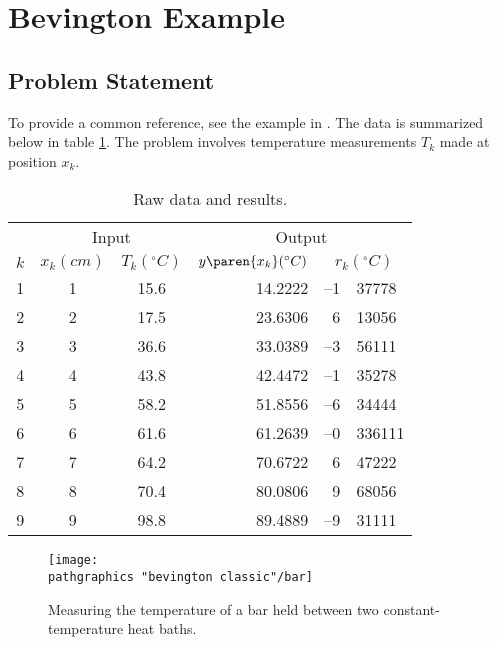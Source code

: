 \section{\label{sec:bevington example}Bevington Example}  %
\subsection{Problem Statement}  %
To provide a common reference, see the example in \cite[ch 6]{Bevington}. The data is summarized below in table \ref{tab:bevington data and results}. The problem involves temperature measurements $T_{k}$ made at position $x_{k}$. 

\begin{table}[h]
	\begin{center}
		\begin{tabular}{rcc|rr@{.}l}
		  & \multicolumn{2}{c}{Input} &  \multicolumn{3}{c}{Output} \\
		  $k$ & $x_{k} (cm) $ & $T_{k} (^{\circ}C)$ & $y\paren{x_{k}} (^{\circ}C)$ & \multicolumn{2}{c}{$r_{k} (^{\circ}C)$} \\\hline
			 1 & 1 & 15.6 & 14.2222 & --1 & 37778 \\
			 2 & 2 & 17.5 & 23.6306 &   6 & 13056 \\
			 3 & 3 & 36.6 & 33.0389 & --3 & 56111 \\
			 4 & 4 & 43.8 & 42.4472 & --1 & 35278 \\
			 5 & 5 & 58.2 & 51.8556 & --6 & 34444 \\
			 6 & 6 & 61.6 & 61.2639 & --0 & 336111 \\
			 7 & 7 & 64.2 & 70.6722 &   6 & 47222 \\
			 8 & 8 & 70.4 & 80.0806 &   9 & 68056 \\
			 9 & 9 & 98.8 & 89.4889 & --9 & 31111 \\
		\end{tabular}
	\end{center}
	\caption{Raw data and results.}
	\label{tab:bevington data and results}
\end{table}%

\begin{figure}[htbp] %
   \centering
   \texttt{[image: \\pathgraphics "bevington classic"/bar]} 
   \caption[Measuring the temperature of a bar.]{Measuring the temperature of a bar held between two constant-temperature heat baths.}
   \label{fig:bar}
\end{figure}

